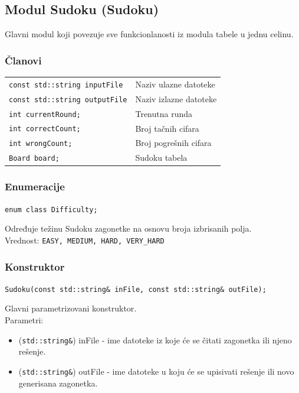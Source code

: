 \documentclass[a4paper]{article}
\begin{document}
    \subsection{Modul Sudoku (Sudoku)}
    Glavni modul koji povezuje sve funkcionlanosti iz modula tabele u jednu celinu.
    \subsubsection{Članovi}
    \begin{tabular}{ l l }
        \texttt{const std::string inputFile} & Naziv ulazne datoteke\\
        \texttt{const std::string outputFile} & Naziv izlazne datoteke\\
        \texttt{int currentRound;} & Trenutna runda\\
        \texttt{int correctCount;} & Broj tačnih cifara\\
        \texttt{int wrongCount;} & Broj pogrešnih cifara\\
        \texttt{Board board;} & Sudoku tabela\\
    \end{tabular}
    
    \subsubsection{Enumeracije}
    \texttt{enum class Difficulty;}
    \par Određuje težinu Sudoku zagonetke na osnovu broja izbrisanih polja. \\ 
    Vrednost: \texttt{EASY, MEDIUM, HARD, VERY\_HARD}

    \subsubsection{Konstruktor}
    {\parindent0pt
    \texttt{Sudoku(const std::string\& inFile, const std::string\& outFile);}
    }
    \par Glavni parametrizovani konstruktor.\\
    Parametri:
    \begin{itemize}
        \item (\texttt{std::string\&}) inFile - ime datoteke iz koje će se čitati zagonetka ili njeno rešenje.
        \item (\texttt{std::string\&}) outFile - ime datoteke u koju će se upisivati rešenje ili novo generisana zagonetka.
    \end{itemize}
\end{document}

